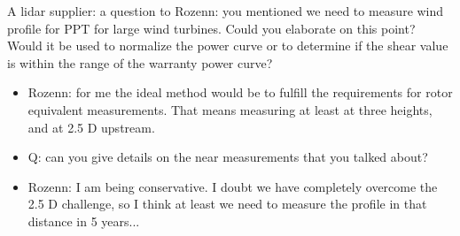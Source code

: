 A lidar supplier: a question to Rozenn: you mentioned we need to measure wind profile for PPT for large wind turbines. Could you elaborate on this point? Would it be used to normalize the power curve or to determine if the shear value is within the range of the warranty power curve?
\begin{itemize}
    \item Rozenn: for me the ideal method would be to fulfill the requirements for rotor equivalent measurements. That means measuring at least at three heights, and at 2.5 D upstream. 
    \item Q: can you give details on the near measurements that you talked about?
    \item Rozenn: I am being conservative. I doubt we have completely overcome the 2.5 D challenge, so I think at least we need to measure the profile in that distance in 5 years...
\end{itemize}

